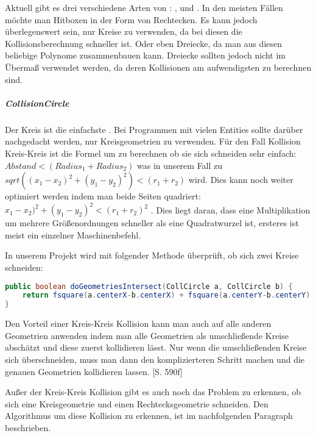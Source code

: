 Aktuell gibt es drei verschiedene Arten von : ,  und . In den meisten Fällen möchte man Hitboxen in der Form von Rechtecken. Es kann jedoch überlegenswert sein, nur Kreise zu verwenden, da bei diesen die Kollisionsberechnung schneller ist. Oder eben Dreiecke, da man aus diesen beliebige Polynome zusammenbauen kann. Dreiecke sollten jedoch nicht im Übermaß verwendet werden, da deren Kollisionen am aufwendigsten zu berechnen sind.

\subparagraph{CollisionCircle}

Der Kreis ist die einfachste . Bei Programmen mit vielen Entities sollte darüber nachgedacht werden, nur Kreisgeometrien zu verwenden.
Für den Fall Kollision Kreis-Kreis ist die Formel um zu berechnen ob sie sich schneiden sehr einfach:
$ Abstand < (Radius_1 + Radius_2) $ was in unserem Fall zu $ sqrt((x_1 - x_2)^2 + (y_1 - y_2)^2) < (r_1 + r_2)$ wird. Dies kann noch weiter optimiert werden indem man beide Seiten quadriert: $ x_1 - x_2)^2 + (y_1 - y_2)^2 < (r_1 + r_2)^2 $ \cite[S 499]{DGIJ}. Dies liegt daran, dass eine Multiplikation um mehrere Größenordnungen schneller als eine Quadratwurzel ist, ersteres ist meist ein einzelner Maschinenbefehl.

In unserem Projekt wird mit folgender Methode überprüft, ob sich zwei Kreise schneiden:

\doinline
\begin{lstlisting}[caption=Erkennen von Kollisionen (Kreis-Kreis), title=\hspace{0 pt}, language=java]
public boolean doGeometriesIntersect(CollCircle a, CollCircle b) {
	return fsquare(a.centerX-b.centerX) + fsquare(a.centerY-b.centerY) < fsquare(a.radius + b.radius);
}
\end{lstlisting}

Den Vorteil einer Kreis-Kreis Kollision kann man auch auf alle anderen Geometrien anwenden indem man alle Geometrien als umschließende Kreise abschätzt und diese zuerst kollidieren lässt. Nur wenn die umschließenden Kreise sich überschneiden, muss man dann den komplizierteren Schritt machen und die genauen Geometrien kollidieren lassen. \cite{EMFGAIA}[S. 590f]

Außer der Kreis-Kreis Kollision gibt es auch noch das Problem zu erkennen, ob sich eine Kreisgeometrie und einen Rechtecksgeometrie schneiden.
Den Algorithmus um diese Kollision zu erkennen, ist im nachfolgenden Paragraph  beschrieben.

